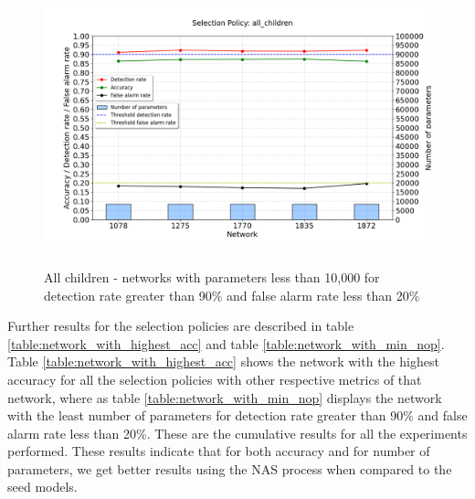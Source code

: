 \begin{figure}[ht!]
    \centering
        \includegraphics[width=1.0\linewidth, height=8cm]{BachelorMasterThesis/ExperimentsAndResults/Figures/all_children/all_children_networks_least_nop_all_less_than_10000.png}
        \caption{All children - networks with parameters less than 10,000 for detection rate greater than 90\% and false alarm rate less than 20\%}
        \label{fig:all_children_networks_least_nop_all_less_than_10000}
\end{figure}

Further results for the selection policies are described in table \ref{table:network_with_highest_acc} and table \ref{table:network_with_min_nop}. Table \ref{table:network_with_highest_acc} shows the network with the highest accuracy for all the selection policies with other respective metrics of that network, where as table \ref{table:network_with_min_nop} displays the network with the least number of parameters for detection rate greater than 90\% and false alarm rate less than 20\%. These are the cumulative results for all the experiments performed. These results indicate that for both accuracy and for number of parameters, we get better results using the NAS process when compared to the seed models.

